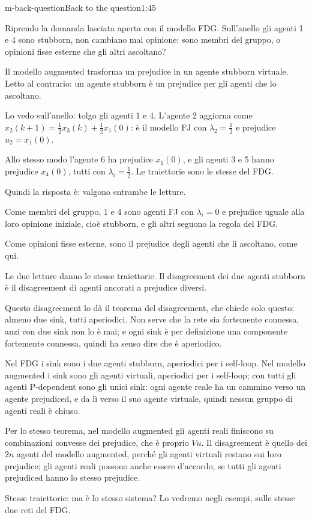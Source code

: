 \begin{slidedue}{m-back-question}{Back to the question}{1:45 {\color{red}}}
  \begin{discorso}
    \item Riprendo la domanda lasciata aperta con il modello FDG. Sull'anello gli agenti 1 e 4 sono stubborn, non cambiano mai opinione: sono membri del gruppo, o opinioni fisse esterne che gli altri ascoltano?
    \item Il modello augmented trasforma un prejudice in un agente stubborn virtuale. Letto al contrario: un agente stubborn è un prejudice per gli agenti che lo ascoltano.
    \item Lo vedo sull'anello: tolgo gli agenti 1 e 4. L'agente 2 aggiorna come $x_2(k+1)=\tfrac12x_3(k)+\tfrac12x_1(0)$: è il modello FJ con $\lambda_2=\tfrac12$ e prejudice $u_2=x_1(0)$.
    \item Allo stesso modo l'agente 6 ha prejudice $x_1(0)$, e gli agenti 3 e 5 hanno prejudice $x_4(0)$, tutti con $\lambda_i=\tfrac12$. Le traiettorie sono le stesse del FDG.
    \item \clic Quindi la risposta è: valgono entrambe le letture.
    \item Come membri del gruppo, 1 e 4 sono agenti FJ con $\lambda_i=0$ e prejudice uguale alla loro opinione iniziale, cioè stubborn, e gli altri seguono la regola del FDG.
    \item Come opinioni fisse esterne, sono il prejudice degli agenti che li ascoltano, come qui.
    \item Le due letture danno le stesse traiettorie. Il disagreement dei due agenti stubborn è il disagreement di agenti ancorati a prejudice diversi.
    \item {\color{blue}Questo disagreement lo dà il teorema del disagreement, che chiede solo questo: almeno due sink, tutti aperiodici. Non serve che la rete sia fortemente connessa, anzi con due sink non lo è mai; e ogni sink è per definizione una componente fortemente connessa, quindi ha senso dire che è aperiodico.}
    \item {\color{blue}Nel FDG i sink sono i due agenti stubborn, aperiodici per i self-loop. Nel modello augmented i sink sono gli agenti virtuali, aperiodici per i self-loop; con tutti gli agenti P-dependent sono gli unici sink: ogni agente reale ha un cammino verso un agente prejudiced, e da lì verso il suo agente virtuale, quindi nessun gruppo di agenti reali è chiuso.}
    \item {\color{blue}Per lo stesso teorema, nel modello augmented gli agenti reali finiscono su combinazioni convesse dei prejudice, che è proprio $Vu$. Il disagreement è quello dei $2n$ agenti del modello augmented, perché gli agenti virtuali restano sui loro prejudice; gli agenti reali possono anche essere d'accordo, se tutti gli agenti prejudiced hanno lo stesso prejudice.}
    \item Stesse traiettorie: ma è lo stesso sistema? Lo vedremo negli esempi, sulle stesse due reti del FDG.
  \end{discorso}
\end{slidedue}

